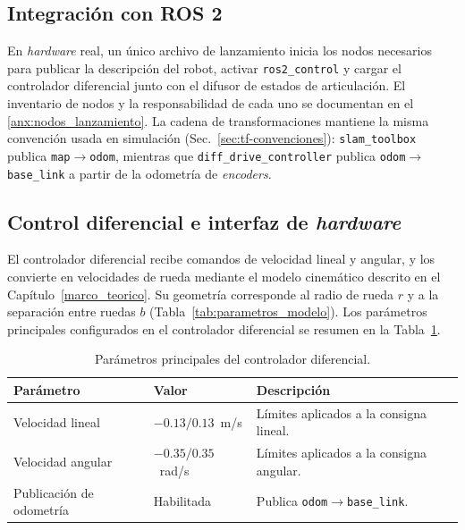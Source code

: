 \subsection{Integración con ROS 2}

En \textit{hardware} real, un único archivo de lanzamiento inicia los nodos necesarios
para publicar la descripción del robot, activar \texttt{ros2\_control} y
cargar el controlador diferencial junto con el difusor de estados de
articulación. El inventario de nodos y la responsabilidad de cada uno se
documentan en el \ref{anx:nodos_lanzamiento}.
La cadena de transformaciones mantiene la misma convención usada en simulación (Sec.~\ref{sec:tf-convenciones}): \texttt{slam\_toolbox} publica \texttt{map}$\rightarrow$\texttt{odom}, mientras que \texttt{diff\_drive\_controller} publica \texttt{odom}$\rightarrow$\texttt{base\_link} a partir de la odometría de \textit{encoders}.

\subsection{Control diferencial e interfaz de \texorpdfstring{\textit{hardware}}{hardware}}
\label{sec:diff_drive_params}

El controlador diferencial recibe comandos de velocidad lineal y angular, y los convierte en velocidades de rueda mediante el modelo cinemático descrito en el Capítulo~\ref{marco_teorico}. Su geometría corresponde al radio de rueda $r$ y a la separación entre ruedas $b$ (Tabla~\ref{tab:parametros_modelo}). Los parámetros principales configurados en el controlador diferencial se
resumen en la Tabla~\ref{tab:diff_drive_params}.

\begin{table}[htbp]
\centering
\caption{Parámetros principales del controlador diferencial.}
\label{tab:diff_drive_params}
\small
\begin{tabular}{llp{6.7cm}}
\toprule
\textbf{Parámetro} & \textbf{Valor} & \textbf{Descripción} \\
\midrule
Velocidad lineal & $-0.13/0.13$~m/s & Límites aplicados a la consigna lineal. \\
Velocidad angular & $-0.35/0.35$~rad/s & Límites aplicados a la consigna angular. \\
Publicación de odometría & Habilitada & Publica \texttt{odom}$\rightarrow$\texttt{base\_link}. \\
\bottomrule
\end{tabular}
\end{table}

